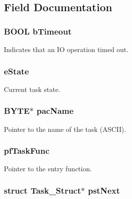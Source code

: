 \subsection{Field Documentation}
\subsubsection[{bTimeout}]{\setlength{\rightskip}{0pt plus 5cm}BOOL {\bf bTimeout}}\label{struct_task___struct_abdadd700e4f7e6550d1aef1338a04cf7}


Indicates that an IO operation timed out. 
\subsubsection[{eState}]{ {\bf eState}}\label{struct_task___struct_af8e22152a953e15164f109345d3341ce}


Current task state. 
\subsubsection[{pacName}]{\setlength{\rightskip}{0pt plus 5cm}BYTE$\ast$ {\bf pacName}}\label{struct_task___struct_a51c7cdaf44bf93b8000092e110ff8661}


Pointer to the name of the task (ASCII). 
\subsubsection[{pfTaskFunc}]{ {\bf pfTaskFunc}}\label{struct_task___struct_ab592f4bdda41ebe28fe3d2186844f24f}


Pointer to the entry function. 
\subsubsection[{pstNext}]{\setlength{\rightskip}{0pt plus 5cm}struct {\bf Task\_\-Struct}$\ast$ {\bf pstNext}}\label{struct_task___struct_ae9b2799a7b88be37bfd49bc8994118ac}



